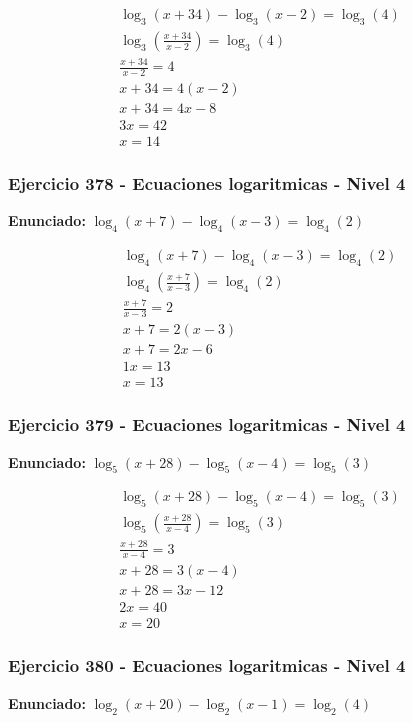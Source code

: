 \documentclass[12pt,a4paper]{article}
\begin{document}
\[
\begin{aligned}
\log_{3}\left(x+34\right) - \log_{3}\left(x-2\right)=\log_{3}\left(4\right)\\
\log_{3}\left(\frac{x+34}{x-2}\right)=\log_{3}\left(4\right)\\
\frac{x+34}{x-2}=4\\
x+34=4(x-2)\\
x+34=4x-8\\
3x=42\\
\boxed{x=14}
\end{aligned}
\]


\subsubsection*{Ejercicio 378 - Ecuaciones logaritmicas - Nivel 4}
\textbf{Enunciado:} \(\log_{4}\left(x+7\right) - \log_{4}\left(x-3\right)=\log_{4}\left(2\right)\)

\[
\begin{aligned}
\log_{4}\left(x+7\right) - \log_{4}\left(x-3\right)=\log_{4}\left(2\right)\\
\log_{4}\left(\frac{x+7}{x-3}\right)=\log_{4}\left(2\right)\\
\frac{x+7}{x-3}=2\\
x+7=2(x-3)\\
x+7=2x-6\\
1x=13\\
\boxed{x=13}
\end{aligned}
\]


\subsubsection*{Ejercicio 379 - Ecuaciones logaritmicas - Nivel 4}
\textbf{Enunciado:} \(\log_{5}\left(x+28\right) - \log_{5}\left(x-4\right)=\log_{5}\left(3\right)\)

\[
\begin{aligned}
\log_{5}\left(x+28\right) - \log_{5}\left(x-4\right)=\log_{5}\left(3\right)\\
\log_{5}\left(\frac{x+28}{x-4}\right)=\log_{5}\left(3\right)\\
\frac{x+28}{x-4}=3\\
x+28=3(x-4)\\
x+28=3x-12\\
2x=40\\
\boxed{x=20}
\end{aligned}
\]


\subsubsection*{Ejercicio 380 - Ecuaciones logaritmicas - Nivel 4}
\textbf{Enunciado:} \(\log_{2}\left(x+20\right) - \log_{2}\left(x-1\right)=\log_{2}\left(4\right)\)
\end{document}
